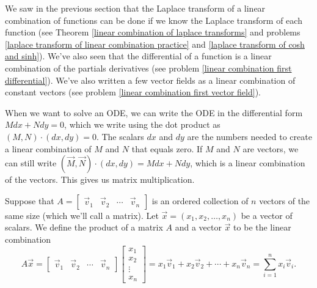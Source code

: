 We saw in the previous section that the Laplace transform of a linear combination of functions can be done if we know the Laplace transform of each function (see Theorem \ref{linear combination of laplace transforms} and problems \ref{laplace transform of linear combination practice} and \ref{laplace transform of cosh and sinh}).  
We've also seen that the differential of a function is a linear combination of the partials derivatives (see problem \ref{linear combination first differential}).  
We've also written a few vector fields as a linear combination of constant vectors (see problem \ref{linear combination first vector field}).   

When we want to solve an ODE, we can write the ODE in the differential form $Mdx+Ndy=0$, which we write using the dot product as $(M,N)\cdot (dx,dy)=0$. The scalars $dx$ and $dy$ are the numbers needed to create a linear combination of $M$ and $N$ that equals zero. 
If $M$ and $N$ are vectors, we can still write $(\vec M,\vec N)\cdot (dx,dy) = Mdx+Ndy$, which is a linear combination of the vectors. This gives us matrix multiplication.

\begin{definition}
Suppose that $A = \begin{bmatrix}\vec v_1&\vec v_2&\cdots& \vec v_n\end{bmatrix}$
is an ordered collection of $n$ vectors of the same size (which we'll call a matrix). Let $\vec x = (x_1,x_2,\ldots,x_n)$ be a vector of scalars. We define the product of a matrix $A$ and a vector $\vec x$ to be the linear combination
$$
A\vec x = \begin{bmatrix}\vec v_1&\vec v_2&\cdots& \vec v_n\end{bmatrix} \begin{bmatrix}x_1\\ x_2 \\ \vdots \\ x_n \end{bmatrix} = x_1\vec v_1+x_2\vec v_2+\cdots+x_n\vec v_n = \sum_{i=1}^n x_i \vec v_i.
$$ 
\end{definition}

